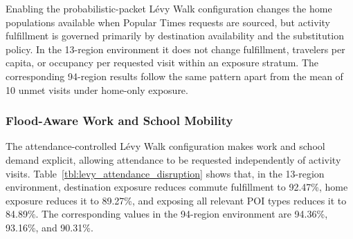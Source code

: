 Enabling the probabilistic-packet L\'evy Walk configuration changes the home populations available when Popular Times requests are sourced, but activity fulfillment is governed primarily by destination availability and the substitution policy. 
In the 13-region environment it does not change fulfillment, travelers per capita, or occupancy per requested visit within an exposure stratum. 
The corresponding 94-region results follow the same pattern apart from the mean of 10 unmet visits under home-only exposure.

\subsubsection{Flood-Aware Work and School Mobility}

The attendance-controlled L\'evy Walk configuration makes work and school demand explicit, allowing attendance to be requested independently of activity visits. Table~\ref{tbl:levy_attendance_disruption} shows that, in the 13-region environment, destination exposure reduces commute fulfillment to 92.47\%, home exposure reduces it to 89.27\%, and exposing all relevant POI types reduces it to 84.89\%. The corresponding values in the 94-region environment are 94.36\%, 93.16\%, and 90.31\%.

